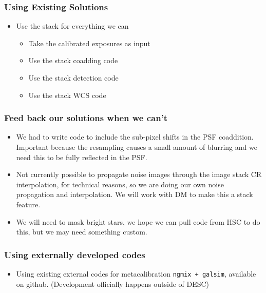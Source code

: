 \documentclass{beamer}
\begin{document}
\frame
{

    \frametitle{Using Existing Solutions}

    \begin{itemize}

                \item Use the stack for everything we can
                    \begin{itemize}
                        \item Take the calibrated exposures as input
                        \item Use the stack coadding code
                        \item Use the stack detection code
                        \item Use the stack WCS code
                    \end{itemize}

    \end{itemize}

}
\frame
{

    \frametitle{Feed back our solutions when we can't}


    \begin{itemize}


                \item We had to write code to include the sub-pixel shifts in
                    the PSF coaddition.  Important because the resampling
                    causes a small amount of blurring and we need this to be
                    fully reflected in the PSF.

                \item Not currently possible to propagate noise images through the image
                  stack CR interpolation, for technical reasons, so we are doing our own noise
                  propagation and interpolation.  We will work with DM to make
                  this a stack feature.

                \item We will need to mask bright stars, we hope we can pull code
                    from HSC to do this, but we may need something custom.



    \end{itemize}

}



\frame
{

    \frametitle{Using externally developed codes}

    \begin{itemize}

        \item Using existing external codes for metacalibration \texttt{ngmix + galsim}, available
            on github.  (Development
            officially happens outside of DESC)

    \end{itemize}

}
\end{document}
